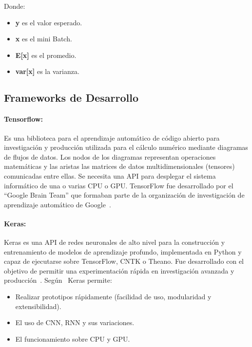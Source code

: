 Donde:
\begin{itemize}
    \item \textbf{y} es el valor esperado. 
    \item \textbf{x} es el mini \gls{Batch}.
    \item \textbf{E[x]} es el promedio.
    \item \textbf{var[x]} es la varianza.
\end{itemize}{}


\subsection{Frameworks de Desarrollo}
    \paragraph{Tensorflow:} Es una biblioteca para el aprendizaje automático de código abierto para investigación y producción utilizada para el cálculo numérico mediante diagramas de flujos de datos. Los nodos de los diagramas representan operaciones matemáticas y las aristas las matrices de datos multidimensionales (tensores) comunicadas entre ellas. Se necesita una API para desplegar el sistema informático de una o varias CPU o GPU. TensorFlow fue desarrollado por el ``Google Brain Team'' que formaban parte de la organización de investigación de aprendizaje automático de Google~\cite{Brain2015}.
   
    \paragraph{Keras:}Keras es una \gls{API} de redes neuronales de alto nivel para la construcción y entrenamiento de modelos de aprendizaje profundo, implementada en Python y capaz de ejecutarse sobre TensorFlow, CNTK o Theano. Fue desarrollado con el objetivo de permitir una experimentación rápida en investigación avanzada y producción~\cite{Brain2015}.
    Según~\cite{Chollet2015} Keras permite: 
    \begin{itemize}
        \item Realizar prototipos rápidamente (facilidad de uso, modularidad y extensibilidad).
        \item El uso de \gls{CNN},  \gls{RNN} y sus variaciones.
        \item El funcionamiento sobre \gls{CPU} y \gls{GPU}.
    \end{itemize}
    
